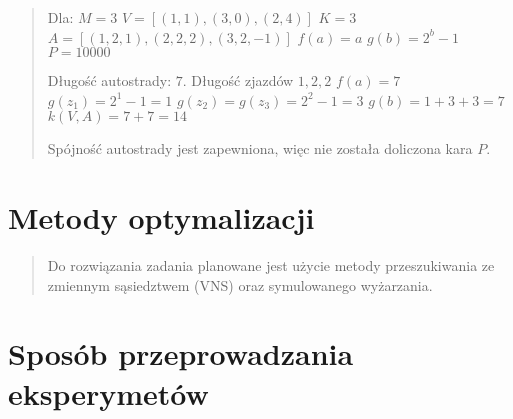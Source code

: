 \documentclass[a4paper]{article}
\begin{document}
\begin{quote}
Dla:\newline
${M = 3}$\newline
${V = [(1, 1), (3, 0), (2, 4)]}$\newline
${K = 3}$\newline
${A = [(1, 2, 1), (2, 2, 2), (3, 2, -1)]}$\newline
${f(a) = a}$\newline
${g(b) = 2^b - 1}$\newline
${P = 10000}$\newline


Długość autostrady: ${7}$. Długość zjazdów ${1, 2, 2}$\newline
${f(a) = 7}$\newline
${g(z_1) = 2^1 - 1 = 1}$\newline
${g(z_2) = g(z_3) = 2^2 - 1 = 3}$\newline
${g(b) = 1 + 3 + 3 = 7}$\newline
${k(V, A) = 7 + 7 = 14}$\newline

Spójność autostrady jest zapewniona, więc nie została doliczona kara ${P}$.
\end{quote}

\section{Metody optymalizacji}

\begin{quote}
Do rozwiązania zadania planowane jest użycie metody przeszukiwania ze zmiennym sąsiedztwem
(VNS) oraz symulowanego wyżarzania.
\end{quote}

\section{Sposób przeprowadzania eksperymetów}
\end{document}

